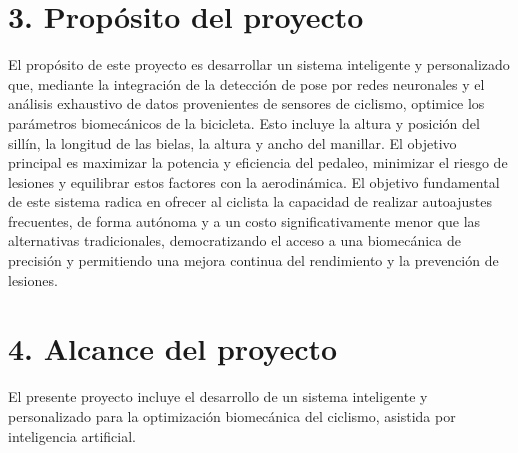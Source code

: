 \documentclass[
11pt, %
]{charter}
\begin{document}
\section{3. Propósito del proyecto}
\label{sec:proposito}
El propósito de este proyecto es desarrollar un sistema inteligente y personalizado que, mediante la integración de la detección de pose por redes neuronales y el análisis exhaustivo de datos provenientes de sensores de ciclismo, optimice los parámetros biomecánicos de la bicicleta. Esto incluye la altura y posición del sillín, la longitud de las bielas, la altura y ancho del manillar. El objetivo principal es maximizar la potencia y eficiencia del pedaleo, minimizar el riesgo de lesiones y equilibrar estos factores con la aerodinámica.
El objetivo fundamental de este sistema radica en ofrecer al ciclista la capacidad de realizar autoajustes frecuentes, de forma autónoma y a un costo significativamente menor que las alternativas tradicionales, democratizando el acceso a una biomecánica de precisión y permitiendo una mejora continua del rendimiento y la prevención de lesiones.

\section{4. Alcance del proyecto}
\label{sec:alcance}

El presente proyecto incluye el desarrollo de un sistema inteligente y personalizado para la optimización biomecánica del ciclismo, asistida por inteligencia artificial.
\end{document}
